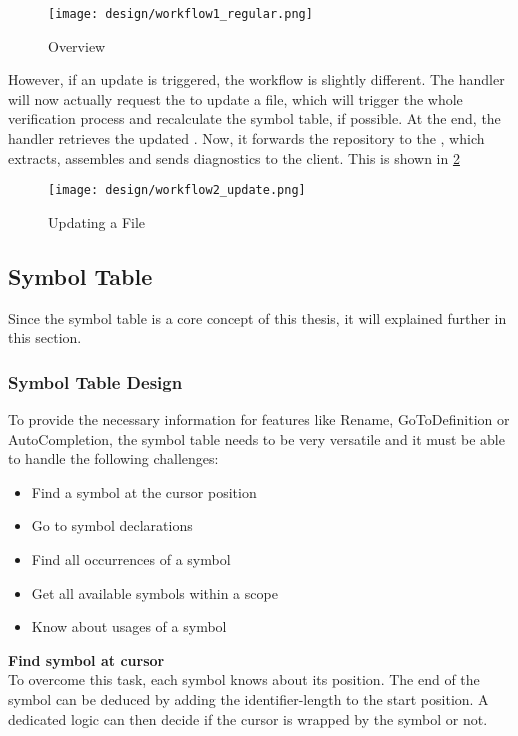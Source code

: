 \begin{figure}[H]
    \centering
    \texttt{[image: design/workflow1\_regular.png]}
    \caption{Overview}
    \label{fig:workflow1}
\end{figure}


However, if an update is triggered, the workflow is slightly different.
The handler will now actually request the  to update a file, which will trigger the whole verification process and recalculate the symbol table, if possible.
At the end, the handler retrieves the updated .
Now, it forwards the repository to the , which extracts, assembles and sends diagnostics to the client.
This is shown in \ref{fig:workflow2}

\begin{figure}[H]
    \centering
    \texttt{[image: design/workflow2\_update.png]}
    \caption{Updating a File}
    \label{fig:workflow2}
\end{figure}


\subsection{Symbol Table}
Since the symbol table is a core concept of this thesis, it will explained further in this section.

\subsubsection{Symbol Table Design}
To provide the necessary information for features like Rename, GoToDefinition or AutoCompletion,
the symbol table needs to be very versatile and it must be able to handle the following challenges:
\begin{itemize}
    \item Find a symbol at the cursor position
    \item Go to symbol declarations
    \item Find all occurrences of a symbol
    \item Get all available symbols within a scope
    \item Know about usages of a symbol
\end{itemize}

\textbf{Find symbol at cursor}\\
To overcome this task, each symbol knows about its position.
The end of the symbol can be deduced by adding the identifier-length to the start position.
A dedicated logic can then decide if the cursor is wrapped by the symbol or not.

